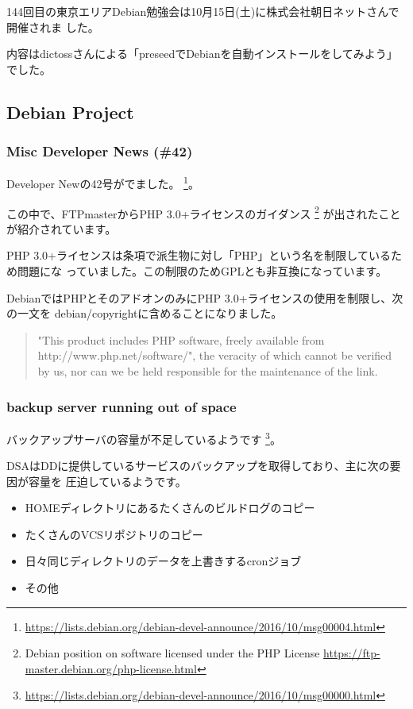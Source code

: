 \documentclass[mingoth,a4paper]{jsarticle}
\begin{document}
144回目の東京エリアDebian勉強会は10月15日(土)に株式会社朝日ネットさんで開催されま
した。

内容はdictossさんによる「preseedでDebianを自動インストールをしてみよう」でした。


\subsection{Debian Project}

\subsubsection{Misc Developer News (\#42)}

Developer Newの42号がでました。
\footnote{\url{https://lists.debian.org/debian-devel-announce/2016/10/msg00004.html}}。

この中で、FTPmasterからPHP 3.0+ライセンスのガイダンス
\footnote{Debian position on software licensed under the PHP License
  \url{https://ftp-master.debian.org/php-license.html}}
が出されたことが紹介されています。

PHP 3.0+ライセンスは条項で派生物に対し「PHP」という名を制限しているため問題にな
っていました。この制限のためGPLとも非互換になっています。

DebianではPHPとそのアドオンのみにPHP 3.0+ライセンスの使用を制限し、次の一文を
debian/copyrightに含めることになりました。

\begin{quote}
  "This product includes PHP software, freely available from http://www.php.net/software/",
  the veracity of which cannot be verified by us, nor can we be held responsible
  for the maintenance of the link.
\end{quote}

\subsubsection{backup server running out of space}

バックアップサーバの容量が不足しているようです
\footnote{\url{https://lists.debian.org/debian-devel-announce/2016/10/msg00000.html}}。

DSAはDDに提供しているサービスのバックアップを取得しており、主に次の要因が容量を
圧迫しているようです。

\begin{itemize}
\item HOMEディレクトリにあるたくさんのビルドログのコピー
\item たくさんのVCSリポジトリのコピー
\item 日々同じディレクトリのデータを上書きするcronジョブ
\item その他
\end{itemize}
\end{document}
